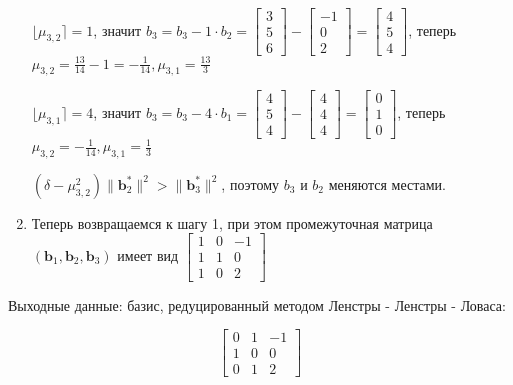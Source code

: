 \documentclass[12pt,a4paper]{scrartcl}
\begin{document}
\begin{enumerate}
	\subitem $\lfloor \mu _{3,2}\rceil =1$, значит $b_{3}=b_{3}-1\cdot b_{2}={\begin{bmatrix}3\\5\\6\end{bmatrix}}-{\begin{bmatrix}-1\\0\\2\end{bmatrix}}={\begin{bmatrix}4\\5\\4\end{bmatrix}}$, теперь $\mu _{3,2}={\frac {13}{14}}-1=-{\frac {1}{14}},\mu _{3,1}={\frac {13}{3}}$
	
	\subitem $\lfloor \mu _{3,1}\rceil =4$, значит $b_{3}=b_{3}-4\cdot b_{1}={\begin{bmatrix}4\\5\\4\end{bmatrix}}-{\begin{bmatrix}4\\4\\4\end{bmatrix}}={\begin{bmatrix}0\\1\\0\end{bmatrix}}$, теперь $\mu _{3,2}=-{\frac {1}{14}},\mu _{3,1}={\frac {1}{3}}$
	
	\subitem $(\delta -\mu _{3,2}^{2})\|\mathbf {b} _{2}^{*}\|^{2}>\|\mathbf {b} _{3}^{*}\|^{2}$, поэтому $b_{3}$ и $b_{2}$ меняются местами.
	
	\item Теперь возвращаемся к шагу 1, при этом промежуточная матрица $(\mathbf {b} _{1},\mathbf {b} _{2},\mathbf {b} _{3})$ имеет вид ${\begin{bmatrix}1&0&-1\\1&1&0\\1&0&2\end{bmatrix}}$
	
\end{enumerate}

Выходные данные: базис, редуцированный методом Ленстры - Ленстры - Ловаса:

$${\begin{bmatrix}0&1&-1\\1&0&0\\0&1&2\end{bmatrix}}$$
\end{document}
